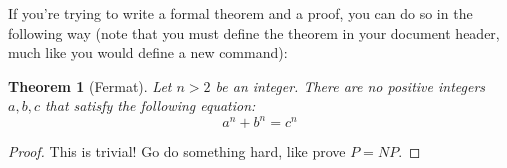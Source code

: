 \documentclass[11pt,letterpaper]{article}
\newtheorem{thm1}{Theorem}
\begin{document}
If you're trying to write a formal theorem and a proof, you can do so in the following way (note
that you must define the theorem in your document header, much like you would define a new command):

\begin{thm1}[Fermat]\label{thm1}
Let $n > 2$ be an integer.  There are no positive integers $a,b,c$ that satisfy the following 
equation:
\[a^n + b^n = c^n\]
\end{thm1}
\begin{proof}
This is trivial!  Go do something hard, like prove $P = NP$.
\end{proof}

\fi
\end{document}
